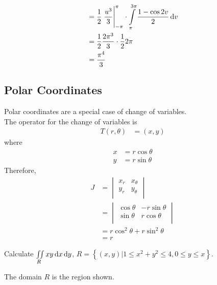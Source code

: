 \documentclass[fleqn, a4paper, 12pt, twoside]{article}
\theoremstyle{definition}
\theoremstyle{theorem}
\begin{document}
{\begin{solution}
\begin{align*}
                                                                                   & = \frac{1}{2} \left. \frac{u^3}{3} \right|_{-\pi}^{\pi} \cdot \int\limits_{\pi}^{3 \pi} \frac{1 - \cos 2 v}{2} \dif v \\
                                                                                   & = \frac{1}{2} \frac{2 \pi^3}{3} \cdot \frac{1}{2} 2 \pi                                                               \\
                                                                                   & = \frac{\pi^4}{3}
	\end{align*}
\end{solution}

\subsection{Polar Coordinates}

Polar coordinates are a special case of change of variables.\\
The operator for the change of variables is
\begin{align*}
	T(r,\theta) & = (x,y)
\end{align*}
where
\begin{align*}
	x & = r \cos \theta \\
	y & = r \sin \theta
\end{align*}
Therefore,
\begin{align*}
	J &=
		\begin{vmatrix}
			x_r & x_{\theta} \\
			y_r & y_{\theta} \\
		\end{vmatrix}\\
	  &=
		\begin{vmatrix}
			\cos \theta & -r \sin \theta \\
			\sin \theta & r \cos \theta  \\
		\end{vmatrix}\\
	  &= r \cos^2 \theta + r \sin^2 \theta\\
	  &= r
\end{align*}

\begin{question}
	Calculate $\iint\limits_{R} x y \dif x \dif y$, $R = \left\{ (x,y) | 1 \le x^2 + y^2 \le 4 , 0 \le y \le x \right\}$.
\end{question}

\begin{solution}
	The domain $R$ is the region shown.
	\begin{figure}[H]
\end{figure}
\end{solution}}
\end{document}

